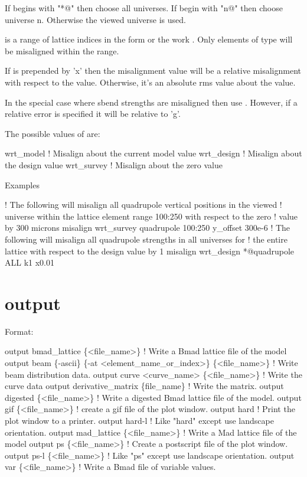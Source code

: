 If  begins with "*@" then choose all universes. If
 begin with "n@" then choose universe n. Otherwise the
viewed universe is used.

 is a range of lattice indices in the form
 or the work . Only elements of type
 will be misaligned within the range.

If  is prepended by 'x' then the misalignment value will be
a relative misalignment with respect to the  value. Otherwise, it's an 
absolute rms value about the  value.

In the special case where sbend strengths are misaligned then use
. However, if a relative error is specified it will be 
relative to 'g'.

The possible values of  are:
\begin{example}
  wrt_model          ! Misalign about the current model value
  wrt_design         ! Misalign about the design value
  wrt_survey         ! Misalign about the zero value
\end{example}

Examples
\begin{example}
   ! The following will misalign all quadrupole vertical positions in the viewed
   ! universe within the lattice element range 100:250 with respect to the zero 
   ! value by 300 microns
  misalign wrt_survey quadrupole 100:250 y_offset 300e-6
   ! The following will misalign all quadrupole strengths in all universes for
   ! the entire lattice with respect to the design value by 1%
  misalign wrt_design *@quadrupole ALL k1 x0.01
\end{example}

\section{output}
\label{s:output}

Format:
\begin{example}
  output bmad_lattice \{<file_name>\}       ! Write a Bmad lattice file of the model
  output beam \{-ascii\} \{-at <element_name_or_index>\} \{<file_name>\} 
                                          ! Write beam distribution data.
  output curve <curve_name> \{<file_name>\} ! Write the curve data
  output derivative_matrix \{file_name\}    ! Write the  matrix.
  output digested \{<file_name>\}     ! Write a digested Bmad lattice file of the model.
  output gif \{<file_name>\}          ! create a gif file of the plot window.
  output hard                       ! Print the plot window to a printer.
  output hard-l                     ! Like "hard" except use landscape orientation. 
  output mad_lattice \{<file_name>\}  ! Write a Mad lattice file of the model
  output ps \{<file_name>\}           ! Create a postscript file of the plot window.
  output ps-l \{<file_name>\}         ! Like "ps" except use landscape orientation.
  output var \{<file_name>\}          ! Write a Bmad file of variable values.
\end{example}

